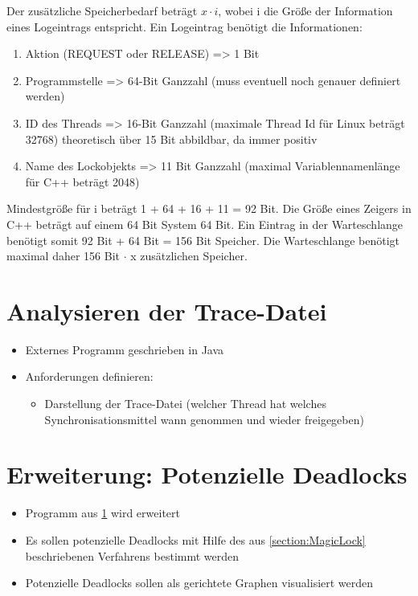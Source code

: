 \begin{itemize}
    Der zusätzliche Speicherbedarf beträgt $x \cdot i$, wobei i die Größe der Information eines Logeintrags entspricht.
    Ein Logeintrag benötigt die Informationen:
    \begin{enumerate}
      \item   Aktion (REQUEST oder RELEASE) => 1 Bit
      \item Programmstelle => 64-Bit Ganzzahl (muss eventuell noch genauer definiert werden)
      \item ID des Threads => 16-Bit Ganzzahl (maximale Thread Id für Linux beträgt 32768) theoretisch über 15 Bit abbildbar, da immer positiv
      \item Name des Lockobjekts => 11 Bit Ganzzahl (maximal Variablennamenlänge für C++ beträgt 2048)
    \end{enumerate}
    Mindestgröße für i beträgt 1 + 64 + 16 + 11 = 92 Bit.
    Die Größe eines Zeigers in C++ beträgt auf einem 64 Bit System 64 Bit.
    Ein Eintrag in der Warteschlange benötigt somit 92 Bit + 64 Bit = 156 Bit Speicher.
    Die Warteschlange benötigt maximal daher 156 Bit $\cdot$ x zusätzlichen Speicher.
\end{itemize}

\section{Analysieren der Trace-Datei}
\label{section:Analysieren der Trace-Datei}
\begin{itemize}
  \item Externes Programm geschrieben in Java
  \item Anforderungen definieren:
  \begin{itemize}
    \item Darstellung der Trace-Datei (welcher Thread hat welches
    Synchronisationsmittel wann genommen und wieder freigegeben) 
  \end{itemize}
\end{itemize}

\section{Erweiterung: Potenzielle Deadlocks}
\label{section:Erweiterung: Potenzielle Deadlocks}
\begin{itemize}
  \item Programm aus \cref{section:Analysieren der Trace-Datei} wird erweitert
  \item Es sollen potenzielle Deadlocks mit Hilfe des aus \cref{section:MagicLock}
 beschriebenen Verfahrens bestimmt werden
  \item Potenzielle Deadlocks sollen als gerichtete Graphen visualisiert werden
\end{itemize}